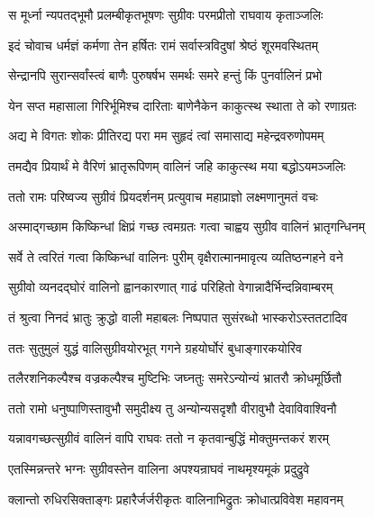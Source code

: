 \twolineshloka
{स मूर्ध्ना न्यपतद्भूमौ प्रलम्बीकृतभूषणः}
{सुग्रीवः परमप्रीतो राघवाय कृताञ्जलिः} %

\twolineshloka
{इदं चोवाच धर्मज्ञं कर्मणा तेन हर्षितः}
{रामं सर्वास्त्रविदुषां श्रेष्ठं शूरमवस्थितम्} %

\twolineshloka
{सेन्द्रानपि सुरान्सर्वांस्त्वं बाणैः पुरुषर्षभ}
{समर्थः समरे हन्तुं किं पुनर्वालिनं प्रभो} %

\twolineshloka
{येन सप्त महासाला गिरिर्भूमिश्च दारिताः}
{बाणेनैकेन काकुत्स्थ स्थाता ते को रणाग्रतः} %

\twolineshloka
{अद्य मे विगतः शोकः प्रीतिरद्य परा मम}
{सुहृदं त्वां समासाद्य महेन्द्रवरुणोपमम्} %

\twolineshloka
{तमद्यैव प्रियार्थं मे वैरिणं भ्रातृरूपिणम्}
{वालिनं जहि काकुत्स्थ मया बद्धोऽयमञ्जलिः} %

\twolineshloka
{ततो रामः परिष्वज्य सुग्रीवं प्रियदर्शनम्}
{प्रत्युवाच महाप्राज्ञो लक्ष्मणानुमतं वचः} %

\twolineshloka
{अस्माद्गच्छाम किष्किन्धां क्षिप्रं गच्छ त्वमग्रतः}
{गत्वा चाह्वय सुग्रीव वालिनं भ्रातृगन्धिनम्} %

\twolineshloka
{सर्वे ते त्वरितं गत्वा किष्किन्धां वालिनः पुरीम्}
{वृक्षैरात्मानमावृत्य व्यतिष्ठन्गहने वने} %

\twolineshloka
{सुग्रीवो व्यनदद्घोरं वालिनो ह्वानकारणात्}
{गाढं परिहितो वेगान्नादैर्भिन्दन्निवाम्बरम्} %

\twolineshloka
{तं श्रुत्वा निनदं भ्रातुः क्रुद्धो वाली महाबलः}
{निष्पपात सुसंरब्धो भास्करोऽस्ततटादिव} %

\twolineshloka
{ततः सुतुमुलं युद्धं वालिसुग्रीवयोरभूत्}
{गगने ग्रहयोर्घोरं बुधाङ्गारकयोरिव} %

\twolineshloka
{तलैरशनिकल्पैश्च वज्रकल्पैश्च मुष्टिभिः}
{जघ्नतुः समरेऽन्योन्यं भ्रातरौ क्रोधमूर्छितौ} %

\twolineshloka
{ततो रामो धनुष्पाणिस्तावुभौ समुदीक्ष्य तु}
{अन्योन्यसदृशौ वीरावुभौ देवाविवाश्विनौ} %

\twolineshloka
{यन्नावगच्छत्सुग्रीवं वालिनं वापि राघवः}
{ततो न कृतवान्बुद्धिं मोक्तुमन्तकरं शरम्} %

\twolineshloka
{एतस्मिन्नन्तरे भग्नः सुग्रीवस्तेन वालिना}
{अपश्यन्राघवं नाथमृश्यमूकं प्रदुद्रुवे} %

\twolineshloka
{क्लान्तो रुधिरसिक्ताङ्गः प्रहारैर्जर्जरीकृतः}
{वालिनाभिद्रुतः क्रोधात्प्रविवेश महावनम्} %

